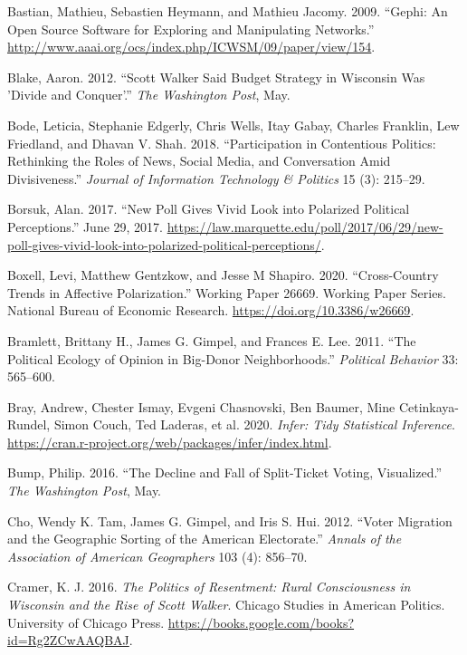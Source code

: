 \documentclass[12pt,]{article}
\begin{document}
\leavevmode\hypertarget{ref-gephi}{}%
Bastian, Mathieu, Sebastien Heymann, and Mathieu Jacomy. 2009. ``Gephi:
An Open Source Software for Exploring and Manipulating Networks.''
\url{http://www.aaai.org/ocs/index.php/ICWSM/09/paper/view/154}.

\leavevmode\hypertarget{ref-blake2012}{}%
Blake, Aaron. 2012. ``Scott Walker Said Budget Strategy in Wisconsin Was
'Divide and Conquer'.'' \emph{The Washington Post}, May.

\leavevmode\hypertarget{ref-bode2018}{}%
Bode, Leticia, Stephanie Edgerly, Chris Wells, Itay Gabay, Charles
Franklin, Lew Friedland, and Dhavan V. Shah. 2018. ``Participation in
Contentious Politics: Rethinking the Roles of News, Social Media, and
Conversation Amid Divisiveness.'' \emph{Journal of Information
Technology \& Politics} 15 (3): 215--29.

\leavevmode\hypertarget{ref-borsuk2017}{}%
Borsuk, Alan. 2017. ``New Poll Gives Vivid Look into Polarized Political
Perceptions.'' June 29, 2017.
\url{https://law.marquette.edu/poll/2017/06/29/new-poll-gives-vivid-look-into-polarized-political-perceptions/}.

\leavevmode\hypertarget{ref-boxell2020}{}%
Boxell, Levi, Matthew Gentzkow, and Jesse M Shapiro. 2020.
``Cross-Country Trends in Affective Polarization.'' Working Paper 26669.
Working Paper Series. National Bureau of Economic Research.
\url{https://doi.org/10.3386/w26669}.

\leavevmode\hypertarget{ref-bramlett2011}{}%
Bramlett, Brittany H., James G. Gimpel, and Frances E. Lee. 2011. ``The
Political Ecology of Opinion in Big-Donor Neighborhoods.''
\emph{Political Behavior} 33: 565--600.

\leavevmode\hypertarget{ref-infer}{}%
Bray, Andrew, Chester Ismay, Evgeni Chasnovski, Ben Baumer, Mine
Cetinkaya-Rundel, Simon Couch, Ted Laderas, et al. 2020. \emph{Infer:
Tidy Statistical Inference}.
\url{https://cran.r-project.org/web/packages/infer/index.html}.

\leavevmode\hypertarget{ref-bump2016}{}%
Bump, Philip. 2016. ``The Decline and Fall of Split-Ticket Voting,
Visualized.'' \emph{The Washington Post}, May.

\leavevmode\hypertarget{ref-cho2012}{}%
Cho, Wendy K. Tam, James G. Gimpel, and Iris S. Hui. 2012. ``Voter
Migration and the Geographic Sorting of the American Electorate.''
\emph{Annals of the Association of American Geographers} 103 (4):
856--70.

\leavevmode\hypertarget{ref-cramer2016}{}%
Cramer, K. J. 2016. \emph{The Politics of Resentment: Rural
Consciousness in Wisconsin and the Rise of Scott Walker}. Chicago
Studies in American Politics. University of Chicago Press.
\url{https://books.google.com/books?id=Rg2ZCwAAQBAJ}.
\end{document}
